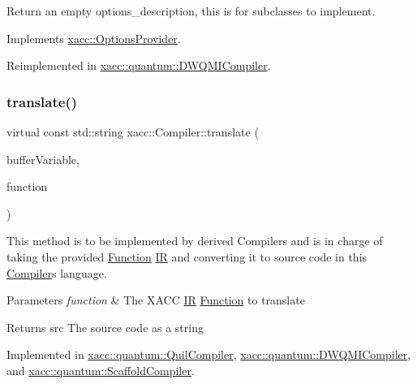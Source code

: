 Return an empty options\+\_\+description, this is for subclasses to implement. 

Implements \hyperlink{a01721_a6d150954f852109bfe2c1ae90222926f}{xacc\+::\+Options\+Provider}.



Reimplemented in \hyperlink{a01137_a0851334cc33b5b1da2694150a0a1a43c}{xacc\+::quantum\+::\+D\+W\+Q\+M\+I\+Compiler}.

\mbox{\label{a01629_aeedbe58a33fed29e4d7694ae743e25e7}} 
\subsubsection{\texorpdfstring{translate()}{translate()}}
{\footnotesize\ttfamily virtual const std\+::string xacc\+::\+Compiler\+::translate (\begin{DoxyParamCaption}\item[{const std\+::string \&}]{buffer\+Variable,  }\item[{std\+::shared\+\_\+ptr$<$ \hyperlink{a01653}{Function} $>$}]{function }\end{DoxyParamCaption})\hspace{0.3cm}{\ttfamily [pure virtual]}}

This method is to be implemented by derived Compilers and is in charge of taking the provided \hyperlink{a01653}{Function} \hyperlink{a01677}{IR} and converting it to source code in this \hyperlink{a01629}{Compiler}\textquotesingle{}s language.


\begin{DoxyParams}{Parameters}
{\em function} & The X\+A\+CC \hyperlink{a01677}{IR} \hyperlink{a01653}{Function} to translate \\
\hline
\end{DoxyParams}
\begin{DoxyReturn}{Returns}
src The source code as a string 
\end{DoxyReturn}


Implemented in \hyperlink{a01157_a66ca00bbb1f30e7bc6dd86b1e267b93b}{xacc\+::quantum\+::\+Quil\+Compiler}, \hyperlink{a01137_a56a345539665099329209b3b5f6810c9}{xacc\+::quantum\+::\+D\+W\+Q\+M\+I\+Compiler}, and \hyperlink{a01177_ac7ca2941e987ba579c6f50cfbd7fb0dc}{xacc\+::quantum\+::\+Scaffold\+Compiler}.



